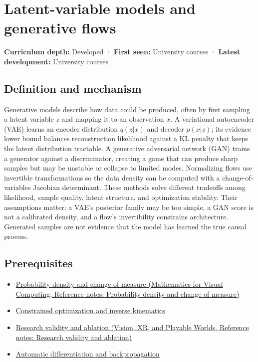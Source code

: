 \hypertarget{appendix-2c568f05ee34}{}\label{referencestart:appendix-2c568f05ee34}
\section{Latent-variable models and generative flows}\label{appendix-2c568f05ee34-latent-variable-models-and-generative-flows}

\textbf{Curriculum depth:} Developed · \textbf{First seen:} University courses · \textbf{Latest development:} University courses

\subsection{Definition and mechanism}\label{appendix-2c568f05ee34-definition-and-mechanism}

Generative models describe how data could be produced, often by first sampling a latent variable \(z\) and mapping it to an observation \(x\). A variational autoencoder (VAE) learns an encoder distribution \(q(z|x)\) and decoder \(p(x|z)\); its evidence lower bound balances reconstruction likelihood against a KL penalty that keeps the latent distribution tractable. A generative adversarial network (GAN) trains a generator against a discriminator, creating a game that can produce sharp samples but may be unstable or collapse to limited modes. Normalizing flows use invertible transformations so the data density can be computed with a change-of-variables Jacobian determinant. These methods solve different tradeoffs among likelihood, sample quality, latent structure, and optimization stability. Their assumptions matter: a VAE's posterior family may be too simple, a GAN score is not a calibrated density, and a flow's invertibility constrains architecture. Generated samples are not evidence that the model has learned the true causal process.

\subsection{Prerequisites}\label{appendix-2c568f05ee34-prerequisites}

\begin{itemize}
\tightlist
\item
  \href{../02-Mathematics-for-Visual-Computing/main.pdf\#nameddest=appendix-4815cd87ab8b}{Probability density and change of measure (Mathematics for Visual Computing, Reference notes: Probability density and change of measure)}
\item
  \hyperref[appendix-29f4bea4c2bb]{Constrained optimization and inverse kinematics}
\item
  \href{../07-Vision-XR-and-Playable-Worlds/main.pdf\#nameddest=appendix-65788587ef78}{Research validity and ablation (Vision, XR, and Playable Worlds, Reference notes: Research validity and ablation)}
\item
  \hyperref[appendix-40df0855b4a7]{Automatic differentiation and backpropagation}
\end{itemize}


